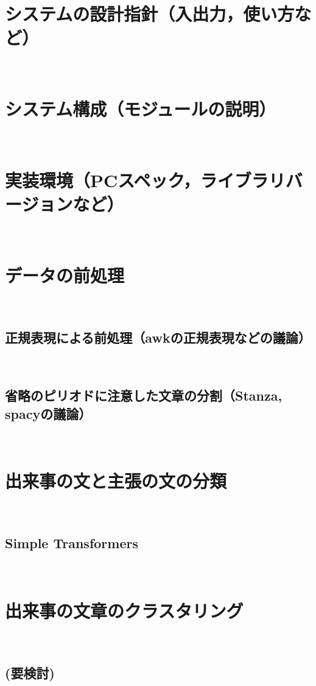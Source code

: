 \documentclass[12pt,a4j]{jreport}
\begin{document}
\section{システムの設計指針（入出力，使い方など）}
~

\section{システム構成（モジュールの説明）}
~

\section{実装環境（PCスペック，ライブラリバージョンなど）}
~

\section{データの前処理}
\label{section_data_preprocessing_implement}
~

\subsection{正規表現による前処理（awkの正規表現などの議論）}
~

\subsection{省略のピリオドに注意した文章の分割（Stanza, spacyの議論）}
~

\section{出来事の文と主張の文の分類}
~

\subsection{Simple Transformers}
~

\section{出来事の文章のクラスタリング}
~

\subsection{(要検討)}
~
\end{document}
